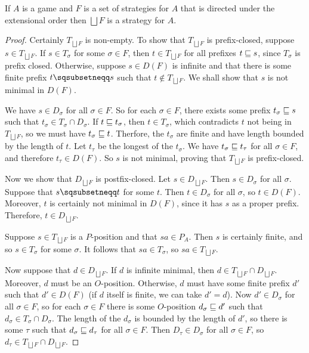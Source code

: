 \documentclass{article}
\newcommand{\exlub}{\bigsqcup}
\begin{document}
\begin{proposition}
  If $A$ is a game and $F$ is a set of strategies for $A$ that is directed under the extensional order then $\exlub F$ is a strategy for $A$.
  \begin{proof}
    Certainly $T_{\exlub F}$ is non-empty.  To show that $T_{\exlub F}$ is prefix-closed, suppose $s\in T_{\exlub F}$.  If $s\in T_\sigma$ for some $\sigma\in F$, then $t\in T_{\exlub F}$ for all prefixes $t\sqsubseteq s$, since $T_\sigma$ is prefix closed.  Otherwise, suppose $s\in D(F)$ is infinite and that there is some finite prefix $t\pprefix s$ such that $t\not\in T_{\exlub F}$.  We shall show that $s$ is not minimal in $D(F)$.  

    We have $s\in D_\sigma$ for all $\sigma\in F$.  So for each $\sigma\in F$, there exists some prefix $t_\sigma\sqsubseteq s$ such that $t_\sigma\in T_\sigma\cap D_\sigma$.  If $t\sqsubseteq t_\sigma$, then $t\in T_\sigma$, which contradicts $t$ not being in $T_{\exlub F}$, so we must have $t_\sigma\sqsubseteq t$.  Therfore, the $t_\sigma$ are finite and have length bounded by the length of $t$.  Let $t_\tau$ be the longest of the $t_\sigma$.  We have $t_\sigma\sqsubseteq t_\tau$ for all $\sigma\in F$, and therefore $t_\tau\in D(F)$.  So $s$ is not minimal, proving that $T_{\exlub F}$ is prefix-closed.

    Now we show that $D_{\exlub F}$ is postfix-closed.  Let $s\in D_{\exlub F}$.  Then $s\in D_\sigma$ for all $\sigma$.  Suppose that $s\pprefix t$ for some $t$.  Then $t\in D_\sigma$ for all $\sigma$, so $t\in D(F)$.  Moreover, $t$ is certainly not minimal in $D(F)$, since it has $s$ as a proper prefix.  Therefore, $t\in D_{\exlub F}$.  

    Suppose $s\in T_{\exlub F}$ is a $P$-position and that $sa\in P_A$.  Then $s$ is certainly finite, and so $s\in T_\sigma$ for some $\sigma$.  It follows that $sa\in T_\sigma$, so $sa\in T_{\exlub F}$.  

    Now suppose that $d\in D_{\exlub F}$.  If $d$ is infinite minimal, then $d\in T_{\exlub F}\cap D_{\exlub F}$.  Moreover, $d$ must be an $O$-position.  Otherwise, $d$ must have some finite prefix $d'$ such that $d'\in D(F)$ (if $d$ itself is finite, we can take $d'=d$).  Now $d'\in D_\sigma$ for all $\sigma\in F$, so for each $\sigma\in F$ there is some $O$-position $d_\sigma\sqsubseteq d'$ such that $d_\sigma\in T_\sigma\cap D_\sigma$.  The length of the $d_\sigma$ is bounded by the length of $d'$, so there is some $\tau$ such that $d_\sigma\sqsubseteq d_\tau$ for all $\sigma\in F$.  Then $D_\tau\in D_\sigma$ for all $\sigma\in F$, so $d_\tau\in T_{\exlub F}\cap D_{\exlub F}$.  


\end{proof}
\end{proposition}
\end{document}
